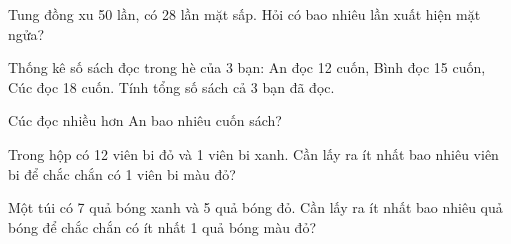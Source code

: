 \begin{ex} %
Tung đồng xu 50 lần, có 28 lần mặt sấp. Hỏi có bao nhiêu lần xuất hiện mặt ngửa?
\end{ex}

\begin{ex} %
Thống kê số sách đọc trong hè của 3 bạn: An đọc 12 cuốn, Bình đọc 15 cuốn, Cúc đọc 18 cuốn. Tính tổng số sách cả 3 bạn đã đọc.
\end{ex}

\begin{ex} %
Cúc đọc nhiều hơn An bao nhiêu cuốn sách?
\end{ex}

\begin{ex} %
Trong hộp có 12 viên bi đỏ và 1 viên bi xanh. Cần lấy ra ít nhất bao nhiêu viên bi để chắc chắn có 1 viên bi màu đỏ?
\end{ex}

\begin{ex} %
Một túi có 7 quả bóng xanh và 5 quả bóng đỏ. Cần lấy ra ít nhất bao nhiêu quả bóng để chắc chắn có ít nhất 1 quả bóng màu đỏ?
\end{ex}
